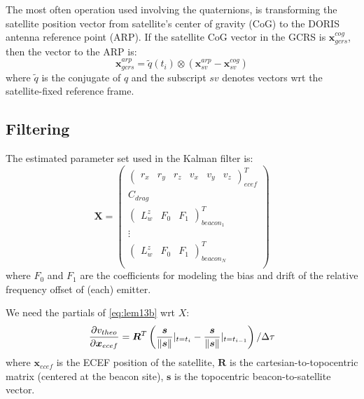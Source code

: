 The most often operation used involving the quaternions, is transforming the 
satellite position vector from satellite's center of gravity (CoG) to the 
DORIS antenna reference point (ARP). If the satellite CoG vector in the GCRS 
is $\bm{x}^{cog}_{gcrs}$, then the vector to the ARP is:
\begin{equation}
  \bm{x}^{arp}_{gcrs} = \tilde{q}(t_i) \otimes (\bm{x}^{arp}_{sv} - \bm{x}^{cog}_{sv})
\end{equation}
where $\tilde{q}$ is the conjugate of $q$ and the subscript $sv$ denotes vectors 
wrt the satellite-fixed reference frame.

\subsection{Filtering}
\label{ssec:filtering}
The estimated parameter set used in the Kalman filter is:
\begin{equation}
  \bm{X} = \begin{pmatrix}
    \begin{pmatrix} r_x & r_y & r_z & v_x & v_y & v_z \end{pmatrix}^T_{ecef} \\
    C_{drag} \\
    \begin{pmatrix} L^z_w & F_0 & F_1 \end{pmatrix}^T_{beacon_1} \\
    \vdots \\
    \begin{pmatrix} L^z_w & F_0 & F_1 \end{pmatrix}^T_{beacon_N} \\
  \end{pmatrix}
\end{equation}
where $F_0$ and $F_1$ are the coefficients for modeling the bias and drift of the 
relative frequency offset of (each) emitter.

We need the partials of \ref{eq:lem13b} wrt $X$:
\begin{equation}
  \frac{\partial v_{theo}}{\partial \bm{x}_{ecef}} = \bm{R}^T \left( \frac{\bm{s}}{\lVert\bm{s}\rVert}|_{t=t_i} - \frac{\bm{s}}{\lVert\bm{s}\rVert}|_{t=t_{i-1}} \right) / \Delta \tau
  \label{eq:partials-pos}
\end{equation}
where $\bm{x}_{ecef}$ is the ECEF position of the satellite, $\bm{R}$ is the 
cartesian-to-topocentric matrix (centered at the beacon site), $\bm{s}$ is the 
topocentric beacon-to-satellite vector.

